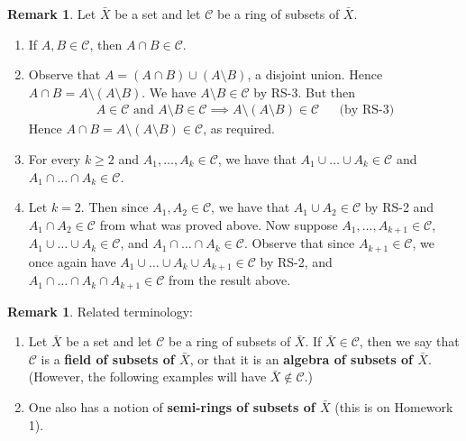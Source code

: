\documentclass[11pt]{article}
\makeatletter
\theoremstyle{definition}
\newtheorem{remark}[thm]{Remark}
\newenvironment{pf}[1][\proofname]{\par
  \pushQED{\qed}%
  \normalfont \topsep0\p@\relax
  \trivlist
  \item[\hskip\labelsep\itshape
  #1\@addpunct{.}]\ignorespaces
}{%
  \popQED\endtrivlist\@endpefalse
}
\makeatother
\begin{document}
\begin{remark}
Let $\bar{X}$ be a set and let $\mathcal{C}$ be a ring of subsets of $\bar{X}$.\vspace{-0.15cm}
\begin{enumerate}
\item If $A, B \in \mathcal{C}$, then $A \cap B \in \mathcal{C}$.\vspace{-1.5ex}
	\begin{pf}
	Observe that $A = (A \cap B) \cup (A \setminus B)$, a disjoint union. Hence $A \cap B = A \setminus (A \setminus B)$. We have $A \setminus B \in \mathcal{C}$ by RS-3. But then
	\begin{align*}
    A \in \mathcal{C} \text{ and } A \setminus B \in \mathcal{C} \implies A \setminus (A \setminus B) \in \mathcal{C} & & \text{(by RS-3)}
    \end{align*}
    Hence $A \cap B = A \setminus (A \setminus B) \in \mathcal{C}$, as required.
	\end{pf}
\item For every $k \geq 2$ and $A_1, \dots, A_k \in \mathcal{C}$, we have that $A_1 \cup \dots \cup A_k \in \mathcal{C}$ and $A_1 \cap \dots \cap A_k \in \mathcal{C}$.\vspace{-1.5ex}
    \begin{pf}
    Let $k = 2$. Then since $A_1, A_2 \in \mathcal{C}$, we have that $A_1 \cup A_2 \in \mathcal{C}$ by RS-2 and $A_1 \cap A_2 \in \mathcal{C}$ from what was proved above. Now suppose $A_1, \dots, A_{k+1} \in \mathcal{C}$, $A_1 \cup \dots \cup A_k \in \mathcal{C}$, and $A_1 \cap \dots \cap A_k \in \mathcal{C}$. Observe that since $A_{k+1} \in \mathcal{C}$, we once again have $A_1 \cup \dots \cup A_k \cup A_{k+1} \in \mathcal{C}$ by RS-2, and $A_1 \cap \dots \cap A_k \cap A_{k+1} \in \mathcal{C}$ from the result above.
    \end{pf}
\end{enumerate}
\end{remark}

\begin{remark}
Related terminology: \vspace{-1.5ex}
\begin{enumerate}
    \item Let $\bar{X}$ be a set and let $\mathcal{C}$ be a ring of subsets of $\bar{X}$. If $\bar{X} \in \mathcal{C}$, then we say that $\mathcal{C}$ is a {\bf field of subsets of $\bar{X}$}, or that it is an {\bf algebra of subsets of $\bar{X}$}. (However, the following examples will have $\bar{X} \notin \mathcal{C}$.)
    \item One also has a notion of {\bf semi-rings of subsets of $\bar{X}$} (this is on Homework 1).
\end{enumerate}
\end{remark}
\end{document}
